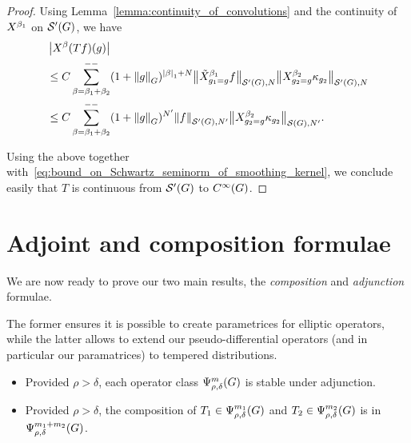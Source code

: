 \begin{proof}
    Using Lemma~\ref{lemma:continuity_of_convolutions} and the continuity of $\LeftDifferentialOperator {\beta_1}$ on ${\mathcal{S}' (G)}$,
    we have
    \begin{align*}
        &\abs {\LeftDifferentialOperator \beta (T f)(g)}\\
        &\leq
        C
        \lcsum{\beta = \beta_1 + \beta_2}
        (1 + \norm [\Group] g)^{\abs \beta_1 + N}
        \seminorm [\TemperedDistributions \Group] N {\RightDifferentialOperator [g_1 = g] {\beta_1} f}
        \seminorm [\TemperedDistributions \Group] N {\LeftDifferentialOperator [g_2 = g] {\beta_2} \kappa_{g_2}}\\
        &\leq
        C
        \lcsum{\beta = \beta_1 + \beta_2}
        (1 + \norm [\Group] g)^{N'}
        \seminorm [\TemperedDistributions \Group] {N'} f
        \seminorm [\Schwartz \Group] {N'} {\LeftDifferentialOperator [g_2 = g] {\beta_2} \kappa_{g_2}}.
    \end{align*}

    Using the above together with~\eqref{eq:bound_on_Schwartz_seminorm_of_smoothing_kernel},
    we conclude easily that $T$ is continuous from ${\mathcal{S}' (G)}$ to ${C^\infty(G)}$.
\end{proof}

\section{Adjoint and composition formulae}
\label{section:adjoint_and_composition_formulae}

We are now ready to prove our two main results,
the \emph{composition} and \emph{adjunction} formulae.

The former ensures it is possible to create parametrices for elliptic operators,
while the latter allows to extend our pseudo-differential operators (and in particular our paramatrices) to tempered distributions.

\begin{itemize}
    \item Provided $\rho > \delta$,
        each operator class $\Psi^{m}_{\rho, \delta}(G)$ is stable under adjunction.
    \item Provided $\rho > \delta$,
        the composition of $T_1 \in \Psi^{m_1}_{\rho, \delta}(G)$ and $T_2 \in \Psi^{m_2}_{\rho, \delta}(G)$ is in $\Psi^{m_1 + m_2}_{\rho, \delta}(G)$.
\end{itemize}

